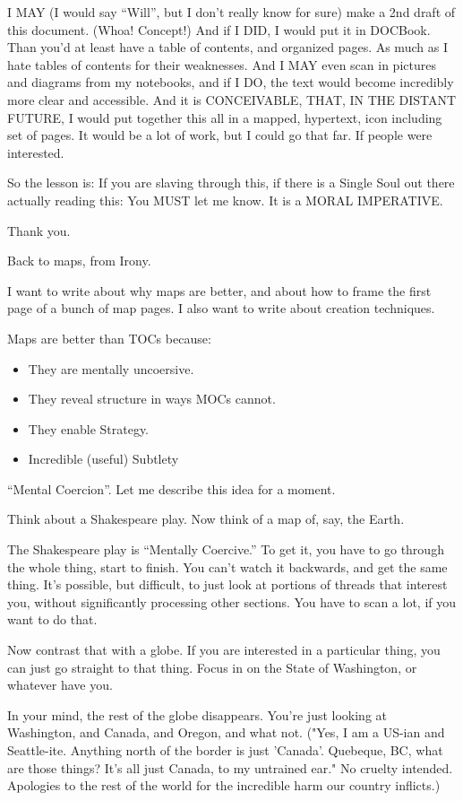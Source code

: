 \documentclass[oneside]{book}
\begin{document}
I MAY (I would say ``Will'', but I don't really know for sure) make a
2nd draft of this document. (Whoa! Concept!) And if I DID, I would
put it in DOCBook. Than you'd at least have a table of contents, and
organized pages. As much as I hate tables of contents for their
weaknesses. And I MAY even scan in pictures and diagrams from my
notebooks, and if I DO, the text would become incredibly more clear
and accessible. And it is CONCEIVABLE, THAT, IN THE DISTANT FUTURE, I
would put together this all in a mapped, hypertext, icon including set
of pages. It would be a lot of work, but I could go that far. If
people were interested.

So the lesson is: If you are slaving through this, if there is a
Single Soul out there actually reading this: You MUST let me know. It
is a MORAL IMPERATIVE.

Thank you.

Back to maps, from Irony.

I want to write about why maps are better, and about how to frame the
first page of a bunch of map pages. I also want to write about
creation techniques.

Maps are better than TOCs because:

\begin{itemize}
\item They are mentally uncoersive.
\item They reveal structure in ways MOCs cannot.
\item They enable Strategy.
\item Incredible (useful) Subtlety
\end{itemize}

``Mental Coercion''. Let me describe this idea for a moment.

Think about a Shakespeare play.
Now think of a map of, say, the Earth.

The Shakespeare play is ``Mentally Coercive.'' To get it, you have to go
through the whole thing, start to finish. You can't watch it
backwards, and get the same thing. It's possible, but difficult, to
just look at portions of threads that interest you, without
significantly processing other sections. You have to scan a lot, if
you want to do that.

Now contrast that with a globe. If you are interested in a particular
thing, you can just go straight to that thing. Focus in on the State
of Washington, or whatever have you.

In your mind, the rest of the globe disappears. You're just looking at
Washington, and Canada, and Oregon, and what not. ("Yes, I am a
US-ian and Seattle-ite. Anything north of the border is just
'Canada'. Quebeque, BC, what are those things? It's all just Canada,
to my untrained ear." No cruelty intended. Apologies to the rest of
the world for the incredible harm our country inflicts.)
\end{document}
